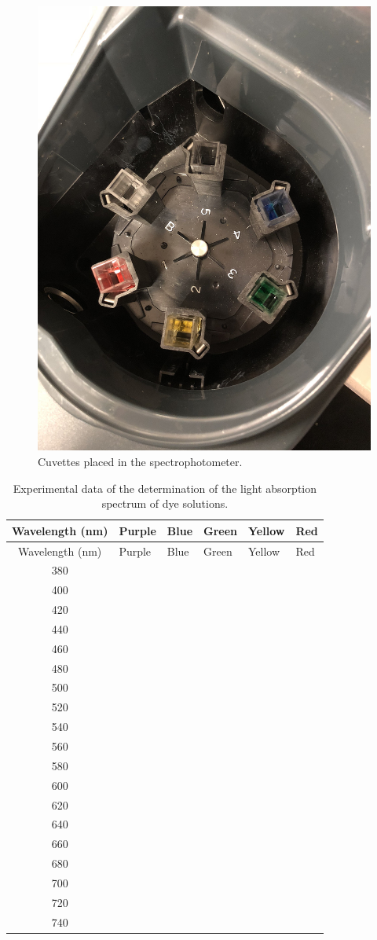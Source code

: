\begin{figure}

{\centering \includegraphics[width=0.7\linewidth]{./figures/photosynthesis/cuvettes}

}

\caption{Cuvettes placed in the spectrophotometer.}\label{fig:cuvettes}
\end{figure}

\begin{longtable}[]{@{}clllll@{}}
\caption{\label{tab:absorption} Experimental data of the determination of
the light absorption spectrum of dye solutions.}\tabularnewline
\toprule
Wavelength (nm) & Purple & Blue & Green & Yellow & Red\tabularnewline
\midrule
\endfirsthead
\toprule
Wavelength (nm) & Purple & Blue & Green & Yellow & Red\tabularnewline
\midrule
\endhead
380 & & & & &\tabularnewline
400 & & & & &\tabularnewline
420 & & & & &\tabularnewline
440 & & & & &\tabularnewline
460 & & & & &\tabularnewline
480 & & & & &\tabularnewline
500 & & & & &\tabularnewline
520 & & & & &\tabularnewline
540 & & & & &\tabularnewline
560 & & & & &\tabularnewline
580 & & & & &\tabularnewline
600 & & & & &\tabularnewline
620 & & & & &\tabularnewline
640 & & & & &\tabularnewline
660 & & & & &\tabularnewline
680 & & & & &\tabularnewline
700 & & & & &\tabularnewline
720 & & & & &\tabularnewline
740 & & & & &\tabularnewline
\bottomrule
\end{longtable}

